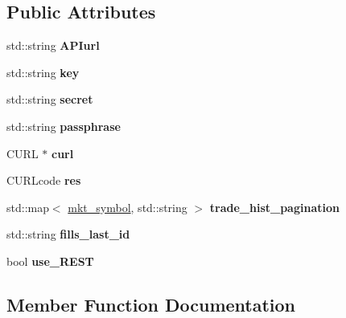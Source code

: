 \subsection*{Public Attributes}
\begin{DoxyCompactItemize}
\item 
\mbox{\label{classclient__gdax_a60857594693d3a1981e4ce15cefed569}} 
std\+::string {\bfseries A\+P\+Iurl}
\item 
\mbox{\label{classclient__gdax_af601c54ba12e81a658e6c1ba4b372ce5}} 
std\+::string {\bfseries key}
\item 
\mbox{\label{classclient__gdax_a30b02f0cf95ccec98ec21c559121a75d}} 
std\+::string {\bfseries secret}
\item 
\mbox{\label{classclient__gdax_ae8e3321863bea122cb084a9f7ee73521}} 
std\+::string {\bfseries passphrase}
\item 
\mbox{\label{classclient__gdax_a6e34720dadbd37c9345eabb1a6496992}} 
C\+U\+RL $\ast$ {\bfseries curl}
\item 
\mbox{\label{classclient__gdax_a1bde11c3d715935718e0c96cf5a440eb}} 
C\+U\+R\+Lcode {\bfseries res}
\item 
\mbox{\label{classclient__gdax_accc59af2c0246dbe6bfbba3df019de64}} 
std\+::map$<$ \mbox{\hyperlink{structmkt__symbol}{mkt\+\_\+symbol}}, std\+::string $>$ {\bfseries trade\+\_\+hist\+\_\+pagination}
\item 
\mbox{\label{classclient__gdax_ae6071ed094235716d66c8f73d8af75e1}} 
std\+::string {\bfseries fills\+\_\+last\+\_\+id}
\item 
\mbox{\label{classclient__gdax_a1d081b59e6acf48a7ffda9fccdb8c5cc}} 
bool {\bfseries use\+\_\+\+R\+E\+ST}
\end{DoxyCompactItemize}


\subsection{Member Function Documentation}
\mbox{\label{classclient__gdax_aa0cc262133e3443dcf8c0fcbd87a2310}} 
